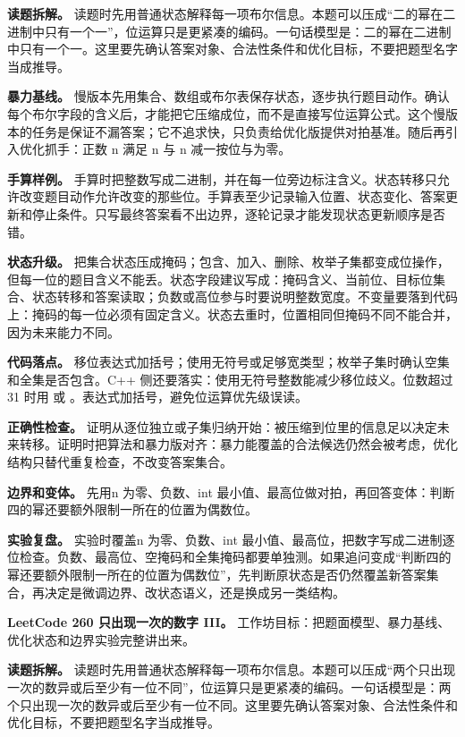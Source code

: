 \textbf{读题拆解。} 读题时先用普通状态解释每一项布尔信息。本题可以压成“二的幂在二进制中只有一个一”，位运算只是更紧凑的编码。一句话模型是：二的幂在二进制中只有一个一。这里要先确认答案对象、合法性条件和优化目标，不要把题型名字当成推导。

\textbf{暴力基线。} 慢版本先用集合、数组或布尔表保存状态，逐步执行题目动作。确认每个布尔字段的含义后，才能把它压缩成位，而不是直接写位运算公式。这个慢版本的任务是保证不漏答案；它不追求快，只负责给优化版提供对拍基准。随后再引入优化抓手：正数 n 满足 n 与 n 减一按位与为零。

\textbf{手算样例。} 手算时把整数写成二进制，并在每一位旁边标注含义。状态转移只允许改变题目动作允许改变的那些位。手算表至少记录输入位置、状态变化、答案更新和停止条件。只写最终答案看不出边界，逐轮记录才能发现状态更新顺序是否错。

\textbf{状态升级。} 把集合状态压成掩码；包含、加入、删除、枚举子集都变成位操作，但每一位的题目含义不能丢。状态字段建议写成：掩码含义、当前位、目标位集合、状态转移和答案读取；负数或高位参与时要说明整数宽度。不变量要落到代码上：掩码的每一位必须有固定含义。状态去重时，位置相同但掩码不同不能合并，因为未来能力不同。

\textbf{代码落点。} 移位表达式加括号；使用无符号或足够宽类型；枚举子集时确认空集和全集是否包含。C++ 侧还要落实：使用无符号整数能减少移位歧义。位数超过 31 时用  或 。表达式加括号，避免位运算优先级误读。

\textbf{正确性检查。} 证明从逐位独立或子集归纳开始：被压缩到位里的信息足以决定未来转移。证明时把算法和暴力版对齐：暴力能覆盖的合法候选仍然会被考虑，优化结构只替代重复检查，不改变答案集合。

\textbf{边界和变体。} 先用n 为零、负数、int 最小值、最高位做对拍，再回答变体：判断四的幂还要额外限制一所在的位置为偶数位。

\textbf{实验复盘。} 实验时覆盖n 为零、负数、int 最小值、最高位，把数字写成二进制逐位检查。负数、最高位、空掩码和全集掩码都要单独测。如果追问变成“判断四的幂还要额外限制一所在的位置为偶数位”，先判断原状态是否仍然覆盖新答案集合，再决定是微调边界、改状态语义，还是换成另一类结构。

\noindent\textbf{LeetCode 260 只出现一次的数字 III。} 工作坊目标：把题面模型、暴力基线、优化状态和边界实验完整讲出来。

\textbf{读题拆解。} 读题时先用普通状态解释每一项布尔信息。本题可以压成“两个只出现一次的数异或后至少有一位不同”，位运算只是更紧凑的编码。一句话模型是：两个只出现一次的数异或后至少有一位不同。这里要先确认答案对象、合法性条件和优化目标，不要把题型名字当成推导。

